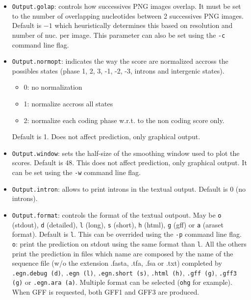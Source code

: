 \documentclass[a4paper,titlepage]{report}
\begin{document}
\begin{itemize}
\item \texttt{Output.golap}: controls how successives PNG images
  overlap. It must be set to the number of overlapping nucleotides
  between 2 successives PNG images. Default is $-1$ which
  heuristically determines this based on resolution and number of nuc.
  per image. This parameter can also be set using the \texttt{-c}
  command line flag. 
    
\item \texttt{Output.normopt}: indicates the way the score are
  normalized accross the possibles states (phase 1, 2, 3, -1, -2, -3,
  introns and intergenic states).
  \begin{itemize}
  \item 0: no normalization
  \item 1: normalize accross all states
  \item 2: normalize each coding phase w.r.t. to the non coding
    score only.
  \end{itemize}
  Default is 1. Does not affect prediction, only graphical output.

\item \texttt{Output.window}: sets the half-size of the smoothing
  window used to plot the scores.  Default is 48. This does not affect
  prediction, only graphical output. It can be set using the
  \texttt{-w} command line flag. 

\item \texttt{Output.intron}: allows to print introns in the textual output.
  Default is 0 (no introns).
 
\item \texttt{Output.format}: controls the format of the textual
  outpout. May be \texttt{o} (stdout), \texttt{d} (detailed), \texttt{l} (long),
  \texttt{s} (short), \texttt{h} (html), \texttt{g} (gff) or \texttt{a} (araset
  format). Default is \texttt{l}. This can be overrided using the
  \texttt{-p} command line flag.
  \texttt{o}: print the prediction on stdout using the same format than \texttt{l}.
  All the others print the prediction in files which name are composed by the 
  name of the sequence file (w/o the extension .fasta, .tfa, .fsa or .txt) completed by
  \texttt{.egn.debug (d)}, \texttt{.egn (l)}, \texttt{.egn.short (s)},
  \texttt{.html (h)}, \texttt{.gff (g)}, \texttt{.gff3 (g)} or \texttt{.egn.ara (a)}.
  Multiple format can be selected (\texttt{ohg} for example). When GFF is requested, both GFF1 and GFF3 are produced.
  

\end{itemize}
\end{document}
